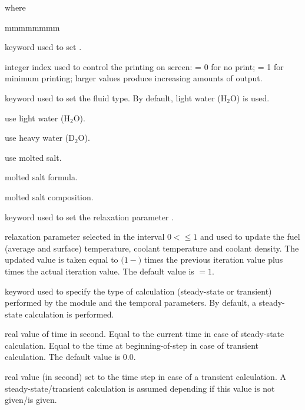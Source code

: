 \noindent where
\begin{ListeDeDescription}{mmmmmmmm}

\item[\moc{EDIT}] keyword used to set .

\item[\dusa{iprint}] integer index used to control the printing on screen:
= 0 for no print; = 1 for minimum printing; larger values produce
increasing amounts of output.

\item[\moc{FLUID}] keyword used to set the fluid type. By default, light water (H$_2$O) is used.

\item[\moc{H2O}] use light water (H$_2$O).

\item[\moc{D2O}] use heavy water (D$_2$O).

\item[\moc{SALT}] use molted salt.

\item[\dusa{sname}] molted salt formula.

\item[\dusa{scomp}] molted salt composition.

\item[\moc{RELAX}] keyword used to set the relaxation parameter .

\item[\dusa{relax}] relaxation parameter selected in the interval $0<$$\le 1$ and used to update
the fuel (average and surface) temperature, coolant temperature and coolant density. The updated value is taken equal to
$(1-$$)$ times the previous iteration value plus  times the actual iteration value. The default
value is $=1$.

\item[\moc{TIME}] keyword used to specify the type of calculation (steady-state or transient) performed by the  module and the temporal parameters. By default, a steady-state calculation is performed.
\item[\dusa{time}] real value of time in second. Equal to the current time in case of steady-state calculation. Equal to the time at beginning-of-step in
case of transient calculation. The default value is 0.0.
\item[\dusa{timestep}] real value (in second) set to the time step in case of a transient calculation. A steady-state/transient calculation is assumed
depending if this value is not given/is given. 


\end{ListeDeDescription}
